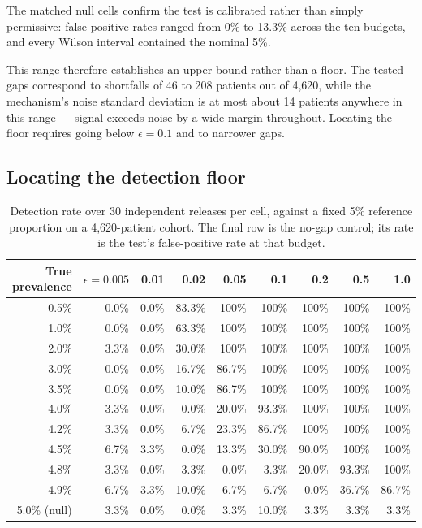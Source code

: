 \documentclass[11pt]{article}
\begin{document}
The matched null cells confirm the test is calibrated rather than simply permissive: false-positive rates ranged from 0\% to 13.3\% across the ten budgets, and every Wilson interval contained the nominal 5\%.

This range therefore establishes an upper bound rather than a floor. The tested gaps correspond to shortfalls of 46 to 208 patients out of 4,620, while the mechanism's noise standard deviation is at most about 14 patients anywhere in this range --- signal exceeds noise by a wide margin throughout. Locating the floor requires going below $\epsilon = 0.1$ and to narrower gaps.

\subsection{Locating the detection floor}

\begin{table}[H]
\centering
\footnotesize
\begin{tabular}{r*{8}{r}}
\toprule
True prevalence & $\epsilon{=}0.005$ & 0.01 & 0.02 & 0.05 & 0.1 & 0.2 & 0.5 & 1.0 \\
\midrule
0.5\%          & 0.0\%  & 0.0\%  & 83.3\% & 100\%  & 100\%  & 100\%  & 100\%  & 100\% \\
1.0\%          & 0.0\%  & 0.0\%  & 63.3\% & 100\%  & 100\%  & 100\%  & 100\%  & 100\% \\
2.0\%          & 3.3\%  & 0.0\%  & 30.0\% & 100\%  & 100\%  & 100\%  & 100\%  & 100\% \\
3.0\%          & 0.0\%  & 0.0\%  & 16.7\% & 86.7\% & 100\%  & 100\%  & 100\%  & 100\% \\
3.5\%          & 0.0\%  & 0.0\%  & 10.0\% & 86.7\% & 100\%  & 100\%  & 100\%  & 100\% \\
4.0\%          & 3.3\%  & 0.0\%  & 0.0\%  & 20.0\% & 93.3\% & 100\%  & 100\%  & 100\% \\
4.2\%          & 3.3\%  & 0.0\%  & 6.7\%  & 23.3\% & 86.7\% & 100\%  & 100\%  & 100\% \\
4.5\%          & 6.7\%  & 3.3\%  & 0.0\%  & 13.3\% & 30.0\% & 90.0\% & 100\%  & 100\% \\
4.8\%          & 3.3\%  & 0.0\%  & 3.3\%  & 0.0\%  & 3.3\%  & 20.0\% & 93.3\% & 100\% \\
4.9\%          & 6.7\%  & 3.3\%  & 10.0\% & 6.7\%  & 6.7\%  & 0.0\%  & 36.7\% & 86.7\% \\
\midrule
5.0\% (null)   & 3.3\%  & 0.0\%  & 0.0\%  & 3.3\%  & 10.0\% & 3.3\%  & 3.3\%  & 3.3\% \\
\bottomrule
\end{tabular}
\caption{Detection rate over 30 independent releases per cell, against a fixed 5\% reference proportion on a 4,620-patient cohort. The final row is the no-gap control; its rate is the test's false-positive rate at that budget.}
\label{tab:floor}
\end{table}
\end{document}
